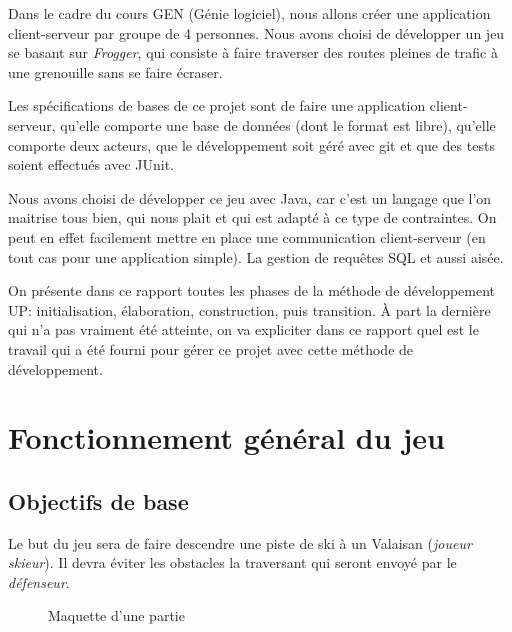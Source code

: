 \documentclass[a4paper,12pt]{article}
\begin{document}
	
	Dans le cadre du cours GEN (Génie logiciel), nous allons créer une application client-serveur par groupe de 4 personnes. Nous avons choisi de développer un jeu se basant sur \textit{Frogger}, qui consiste à faire traverser des routes pleines de trafic à une grenouille sans se faire écraser. 
	
	Les spécifications de bases de ce projet sont de faire une application client-serveur, qu'elle comporte une base de données (dont le format est libre), qu'elle comporte deux acteurs, que le développement soit géré avec git et que des tests soient effectués avec JUnit.
	
	Nous avons choisi de développer ce jeu avec Java, car c'est un langage que l'on maitrise tous bien, qui nous plait et qui est adapté à ce type de contraintes. On peut en effet facilement mettre en place une communication client-serveur (en tout cas pour une application simple). La gestion de requêtes SQL et aussi aisée. 
	
	On présente dans ce rapport toutes les phases de la méthode de développement UP: initialisation, élaboration, construction, puis transition. À part la dernière qui n'a pas vraiment été atteinte, on va expliciter dans ce rapport quel est le travail qui a été fourni pour gérer ce projet avec cette méthode de développement.
	
	\section{Fonctionnement général du jeu}
	
	
	\subsection{Objectifs de base}
	
	Le but du jeu sera de faire descendre une piste de ski à un Valaisan (\textit{joueur skieur}). Il devra éviter les obstacles la traversant qui seront envoyé par le \textit{défenseur}.
	
	\begin{figure}[h!]
		\centering
		\caption{Maquette d'une partie}
		\label{fig:maquette}
	\end{figure}
	
\end{document}
